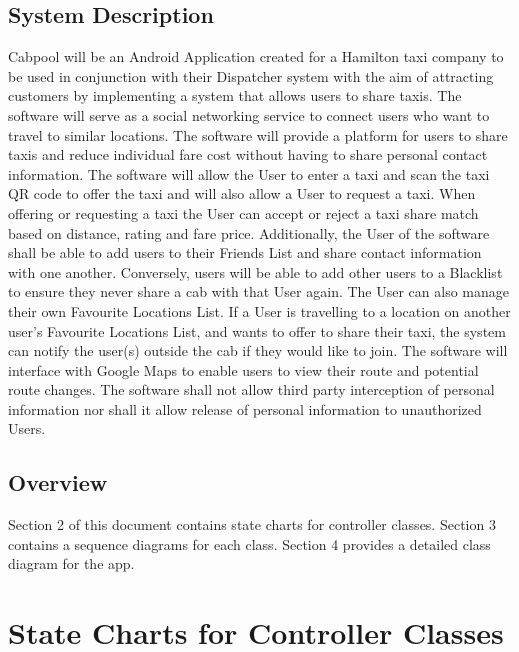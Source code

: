 \documentclass[english]{article}
\begin{document}
\subsection{System Description}
\label{sub:system_description}

Cabpool will be an Android Application created for a Hamilton taxi company to be used in conjunction with their Dispatcher system with the aim of attracting customers by implementing a system that allows users to share taxis. The software will serve as a social networking service to connect users who want to travel to similar locations. The software will provide a platform for users to share taxis and reduce individual fare cost without having to share personal contact information. The software will allow the User to enter a taxi and scan the taxi QR code to offer the taxi and will also allow a User to request a taxi. When offering or requesting a taxi the User can accept or reject a taxi share match based on distance, rating and fare price. \newline
\newline
Additionally, the User of the software shall be able to add users to their Friends List and share contact information with one another. Conversely, users will be able to add other users to a Blacklist to ensure they never share a cab with that User again. The User can also manage their own Favourite Locations List. If a User is travelling to a location on another user's Favourite Locations List, and wants to offer to share their taxi, the system can notify the user(s) outside the cab if they would like to join. The software will interface with Google Maps to enable users to view their route and potential route changes. The software shall not allow third party interception of personal information nor shall it allow release of personal information to unauthorized Users.

\subsection{Overview}
\label{sub:overview}
Section 2 of this document contains state charts for controller classes. Section 3 contains a sequence diagrams for each class. Section 4 provides a detailed class diagram for the app.


\section{State Charts for Controller Classes}
\label{sec:state_charts_for_controller_classes}
\end{document}
